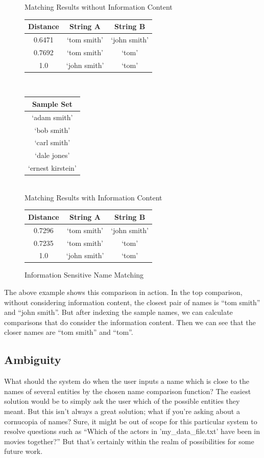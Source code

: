 \documentclass[11pt]{article}
\begin{document}
{\begin{figure}[h!]
    \centering
Matching Results without Information Content\\
\begin{tabular}{c|c|c}
  Distance & String A & String B \\
\hline
  0.6471 & `tom smith' & `john smith' \\
  0.7692 & `tom smith' & `tom' \\
  1.0 & `john smith' & `tom'
\end{tabular}
\\
\begin{tabular}{ c}
Sample Set\\
\hline
`adam smith' \\
`bob smith' \\
`carl smith' \\
`dale jones' \\
`ernest kirstein'
\end{tabular}
\\
Matching Results with Information Content\\
\begin{tabular}{c|c|c}
  Distance & String A & String B \\
\hline
  0.7296 & `tom smith' & `john smith' \\
  0.7235 & `tom smith' & `tom' \\
  1.0 & `john smith' & `tom'
\end{tabular}
\caption{Information Sensitive Name Matching}
\label{fig:lev_comp}
\end{figure}

The above example shows this comparison in action. In the top comparison,
without considering information content, the closest pair of names is
``tom smith'' and ``john smith''. But after indexing the sample names, we
can calculate comparisons that do consider the information content. Then
we can see that the closer names are ``tom smith'' and ``tom''.

\subsection{Ambiguity}
What should the system do when the user inputs a name which is close
to the names of several entities by the chosen name comparison
function? The easiest solution would be to simply ask the user which
of the possible entities they meant. But this isn't always a great
solution; what if you're asking about a cornucopia of names?
Sure, it might be out of scope for this particular system to
resolve questions such as ``Which of the actors in 'my\_data\_file.txt'
have been in movies together?'' But that's certainly within the
realm of possibilities for some future work.

}
\end{document}
